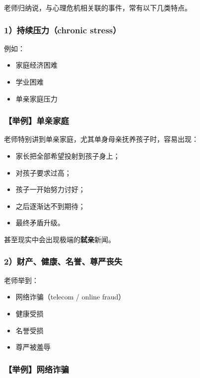 \documentclass[
  chinese,
  9pt,
  a4paper,
]{ctexart}
\providecommand{\tightlist}{%
  \setlength{\itemsep}{0pt}\setlength{\parskip}{0pt}}
\begin{document}
老师归纳说，与心理危机相关联的事件，常有以下几类特点。

\subsubsection{1）持续压力（chronic
stress）}\label{ux6301ux7eedux538bux529bchronic-stress}

例如：

\begin{itemize}
\tightlist
\item
  家庭经济困难
\item
  学业困难
\item
  单亲家庭压力
\end{itemize}

\subsubsection{【举例】单亲家庭}\label{ux4e3eux4f8bux5355ux4eb2ux5bb6ux5ead}

老师特别讲到单亲家庭，尤其单身母亲抚养孩子时，容易出现：

\begin{itemize}
\tightlist
\item
  家长把全部希望投射到孩子身上；
\item
  对孩子要求过高；
\item
  孩子一开始努力讨好；
\item
  之后逐渐达不到期待；
\item
  最终矛盾升级。
\end{itemize}

甚至现实中会出现极端的\textbf{弑亲}新闻。

\subsubsection{2）财产、健康、名誉、尊严丧失}\label{ux8d22ux4ea7ux5065ux5eb7ux540dux8a89ux5c0aux4e25ux4e27ux5931}

老师举到：

\begin{itemize}
\tightlist
\item
  网络诈骗（telecom / online fraud）
\item
  健康受损
\item
  名誉受损
\item
  尊严被羞辱
\end{itemize}

\subsubsection{【举例】网络诈骗}\label{ux4e3eux4f8bux7f51ux7edcux8bc8ux9a97}
\end{document}
